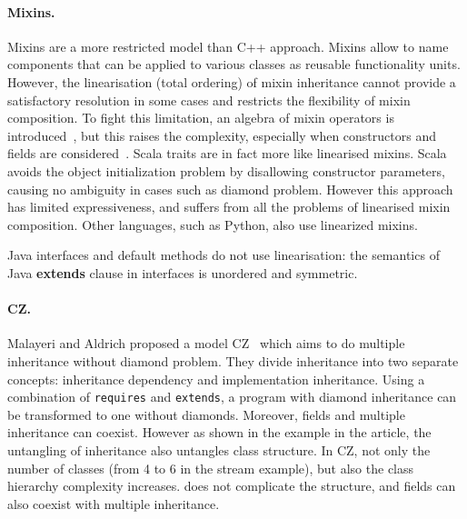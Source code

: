 \paragraph{Mixins.}
Mixins are a more restricted model than C++ approach. Mixins allow to name
components that can be applied to various classes as reusable functionality
units. However, %
the linearisation (total ordering) of
mixin inheritance cannot provide a satisfactory resolution in some cases and
restricts the flexibility of mixin composition. To fight this limitation, an
algebra of mixin operators is introduced~\cite{ancona2002calculus}, but this
raises the complexity, especially when constructors and fields
are considered~\cite{marco09FJigsaw}. Scala traits are in fact more like linearised mixins.
Scala avoids the object initialization
problem by disallowing constructor parameters, causing no ambiguity in cases
such as diamond problem. However this approach has limited expressiveness, and
suffers from all the problems of linearised mixin composition. Other languages, such as 
Python, also use linearized mixins.
\begin{comment}
Python also offers multiple inheritance via linearised mixins. Indeed in python any class is implicitly a mixin, and mixin composition informally expressed as\\*
\Q@ class A use B,C {...new methods...}@\\*
can be expressed in python as \\*
\Q@ class Aux: ...new methods...@\\*
\Q@ class A(B,C,Aux): pass@ 
\end{comment}
\noindent Java interfaces and default methods do not use
linearisation: the semantics of Java \textbf{extends} clause in
interfaces is unordered and symmetric.


\paragraph{CZ.}
Malayeri and Aldrich proposed a model CZ~\cite{malayeri2009cz} which aims to do
multiple inheritance without diamond problem. They divide inheritance into two
separate concepts: inheritance dependency and implementation inheritance. Using
a combination of \texttt{requires} and \texttt{extends}, a program with diamond
inheritance can be transformed to one without diamonds. Moreover, fields and
multiple inheritance can coexist. However as shown in the example in the
article, the untangling of inheritance also untangles class structure. In CZ,
not only the number of classes (from 4 to 6 in the stream example), but also the
class hierarchy complexity increases. \mixin does not complicate the
structure, and fields can also coexist with multiple inheritance.

